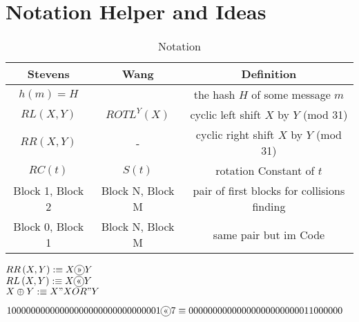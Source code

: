 \section{Notation Helper and Ideas}


\begin{table}[]
    \caption*{\large Notation}
    \begin{tabular}{ c | c | c }
    Stevens & Wang  & Definition  \\
    \hline 
    $h(m) = H$ &  & the hash $H$ of some message $m$\\
    $ RL \left(X , Y \right) $  & $ ROTL^{Y} \left( X\right) $  & cyclic left shift $X$ by $Y$ (mod 31) \\
    $ RR \left(X , Y \right) $  & -                             & cyclic right shift $X$ by $Y$ (mod 31) \\
    $ RC \left(t \right) $      &$ S \left(t \right) $          & rotation Constant of $t$ \\
    Block 1, Block 2 & Block N, Block M & pair of first blocks for collisions finding   \\
    Block 0, Block 1 & Block N, Block M & same pair but im Code\\
    \end{tabular}
    \label{notation}
\end{table}

$RR\left(X,Y\right) :\equiv X  \circled{>>} Y$\\
$RL\left(X,Y\right) :\equiv X  \circled{<<} Y$\\
$X \oplus Y :\equiv X "XOR"  Y$


\begin{align*}
10000000000000000000000000000001  \circled{<<} 7 &\equiv 00000000000000000000000011000000
\end{align*}
  


